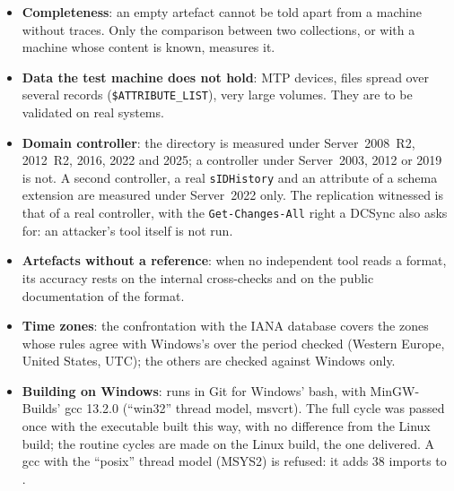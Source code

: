 \documentclass[11pt,a4paper,oneside]{report}
\begin{document}
\begin{itemize}
  \item \textbf{Completeness}: an empty artefact cannot be told apart from a
    machine without traces. Only the comparison between two collections, or
    with a machine whose content is known, measures it.
  \item \textbf{Data the test machine does not hold}: MTP devices,
    files spread over several  records
    (\texttt{\$ATTRIBUTE\_LIST}), very large volumes. They are to be validated
    on real systems.
  \item \textbf{Domain controller}: the directory is measured under Server~2008~R2,
    2012~R2, 2016, 2022 and 2025; a controller under Server~2003, 2012 or 2019
    is not. A second controller, a real \texttt{sIDHistory} and an attribute of
    a schema extension are measured under Server~2022 only. The replication
    witnessed is that of a real controller, with the
    \texttt{Get-Changes-All} right a DCSync also asks for: an attacker's tool
    itself is not run.
  \item \textbf{Artefacts without a reference}: when no independent tool reads
    a format, its accuracy rests on the internal cross-checks and on the public
    documentation of the format.
  \item \textbf{Time zones}: the confrontation with the IANA database covers
    the zones whose rules agree with Windows's over the period checked
    (Western Europe, United States, UTC); the others are checked against
    Windows only.
  \item \textbf{Building on Windows}:  runs
     in Git for Windows' bash, with MinGW-Builds' gcc
    13.2.0 (``win32'' thread model, msvcrt). The full cycle was passed once with
    the executable built this way, with no difference from the Linux build; the
    routine cycles are made on the Linux build, the one delivered. A gcc with
    the ``posix'' thread model (MSYS2) is refused: it adds 38 imports to
    .
\end{itemize}
\end{document}
